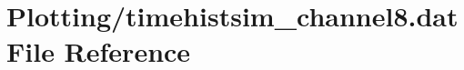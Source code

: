 \hypertarget{Plotting_2timehistsim__channel8_8dat}{}\section{Plotting/timehistsim\+\_\+channel8.dat File Reference}
\label{Plotting_2timehistsim__channel8_8dat}
